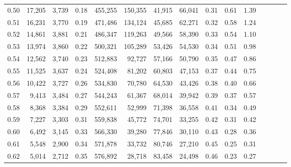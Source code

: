 \begin{tabular}{rrrcrrrrrrrrrrr}
0.50 &  17,205 &  3,739 &                                       0.18 &  455,255 &  150,355 &   41,915 &   66,041 &  0.31 &  0.61 &                         1.39 \\
0.51 &  16,231 &  3,770 &                                       0.19 &  471,486 &  134,124 &   45,685 &   62,271 &  0.32 &  0.58 &                         1.24 \\
0.52 &  14,861 &  3,881 &                                       0.21 &  486,347 &  119,263 &   49,566 &   58,390 &  0.33 &  0.54 &                         1.10 \\
0.53 &  13,974 &  3,860 &                                       0.22 &  500,321 &  105,289 &   53,426 &   54,530 &  0.34 &  0.51 &                         0.98 \\
0.54 &  12,562 &  3,740 &                                       0.23 &  512,883 &   92,727 &   57,166 &   50,790 &  0.35 &  0.47 &                         0.86 \\
0.55 &  11,525 &  3,637 &                                       0.24 &  524,408 &   81,202 &   60,803 &   47,153 &  0.37 &  0.44 &                         0.75 \\
0.56 &  10,422 &  3,727 &                                       0.26 &  534,830 &   70,780 &   64,530 &   43,426 &  0.38 &  0.40 &                         0.66 \\
0.57 &   9,413 &  3,484 &                                       0.27 &  544,243 &   61,367 &   68,014 &   39,942 &  0.39 &  0.37 &                         0.57 \\
0.58 &   8,368 &  3,384 &                                       0.29 &  552,611 &   52,999 &   71,398 &   36,558 &  0.41 &  0.34 &                         0.49 \\
0.59 &   7,227 &  3,303 &                                       0.31 &  559,838 &   45,772 &   74,701 &   33,255 &  0.42 &  0.31 &                         0.42 \\
0.60 &   6,492 &  3,145 &                                       0.33 &  566,330 &   39,280 &   77,846 &   30,110 &  0.43 &  0.28 &                         0.36 \\
0.61 &   5,548 &  2,900 &                                       0.34 &  571,878 &   33,732 &   80,746 &   27,210 &  0.45 &  0.25 &                         0.31 \\
0.62 &   5,014 &  2,712 &                                       0.35 &  576,892 &   28,718 &   83,458 &   24,498 &  0.46 &  0.23 &                         0.27 \\

\end{tabular}

